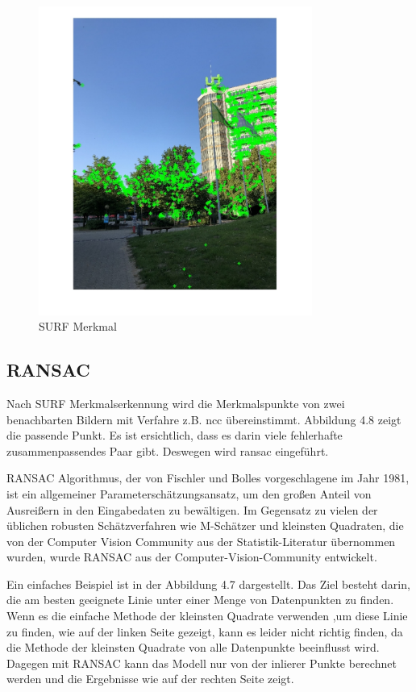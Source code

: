 \begin{figure}[H]
 \centering 
 \includegraphics[keepaspectratio,width=0.8\textwidth]{images/4_ZweiteErfahrung/SURF_Detektion.pdf}
 \caption{SURF Merkmal}
 \label{fig:SURF Merkmal}
\end{figure} 


\subsection{RANSAC}

Nach SURF Merkmalserkennung wird die Merkmalspunkte von zwei benachbarten Bildern mit Verfahre z.B. \gls{ncc} übereinstimmt. Abbildung 4.8 zeigt die passende Punkt. Es ist ersichtlich, dass es darin viele fehlerhafte zusammenpassendes Paar gibt. Deswegen wird \gls{ransac} eingeführt.

RANSAC Algorithmus, der von Fischler und Bolles \cite{ransac1} vorgeschlagene im Jahr 1981, ist ein allgemeiner Parameterschätzungsansatz, um den großen Anteil von Ausreißern in den Eingabedaten zu bewältigen. Im Gegensatz zu vielen der üblichen robusten Schätzverfahren wie M-Schätzer und kleinsten Quadraten, die von der Computer Vision Community aus der Statistik-Literatur übernommen wurden, wurde RANSAC aus der Computer-Vision-Community entwickelt. 

Ein einfaches Beispiel ist in der Abbildung 4.7 dargestellt. Das Ziel besteht darin, die am besten geeignete Linie unter einer Menge von Datenpunkten zu finden. Wenn es die einfache Methode der kleinsten Quadrate verwenden ,um diese Linie zu finden, wie auf der linken Seite gezeigt, kann es leider nicht richtig finden, da die Methode der kleinsten Quadrate von alle Datenpunkte beeinflusst wird. Dagegen mit RANSAC kann das Modell nur von der inlierer Punkte berechnet werden und die Ergebnisse wie auf der rechten Seite zeigt. 

